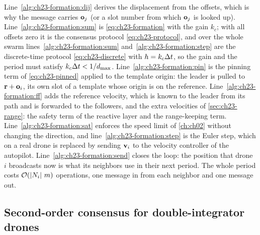 Line~\ref{alg:ch23-formation:dij} derives the displacement from the offsets,
which is why the message carries $\mathbf{o}_j$ (or a slot number from which
$\mathbf{o}_j$ is looked up). Line~\ref{alg:ch23-formation:sum} is
\cref{eq:ch23-formation} with the gain $k_c$; with all offsets zero it is the
consensus protocol \cref{eq:ch23-protocol}, and over the whole swarm
lines~\ref{alg:ch23-formation:sum} and~\ref{alg:ch23-formation:step} are the
discrete-time protocol \cref{eq:ch23-discrete} with $h = k_c\Delta t$, so the
gain and the period must satisfy $k_c\Delta t < 1/d_{\max}$.
Line~\ref{alg:ch23-formation:pin} is the pinning term of
\cref{eq:ch23-pinned} applied to the template origin: the leader is pulled to
$\mathbf{r} + \mathbf{o}_i$, its own slot of a template whose origin is on the
reference. Line~\ref{alg:ch23-formation:ff} adds the reference velocity, which
is known to the leader from its path and is forwarded to the followers, and the
extra velocities of \cref{sec:ch23-range}: the safety term of the reactive
layer and the range-keeping term. Line~\ref{alg:ch23-formation:sat} enforces
the speed limit of \cref{ch:ch02} without changing the direction, and
line~\ref{alg:ch23-formation:step} is the Euler step, which on a real drone is
replaced by sending $\mathbf{v}_i$ to the velocity controller of the autopilot.
Line~\ref{alg:ch23-formation:send} closes the loop: the position that drone
$i$ broadcasts now is what its neighbors use in their next period. The whole
period costs $\mathcal{O}\!\left(\left\lvert N_i \right\rvert\,m\right)$ operations, one message in from each
neighbor and one message out.

\subsection{Second-order consensus for double-integrator drones}
\label{sec:ch23-second}

